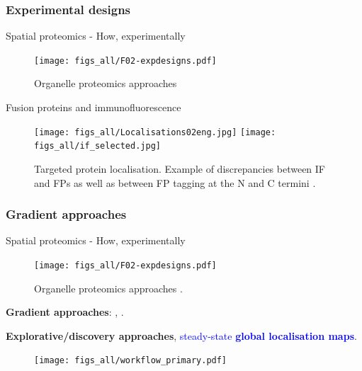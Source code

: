 \subsubsection*{Experimental designs}
\label{sec:expdesign}

\begin{frame}{Spatial proteomics - How, experimentally}
  \begin{figure}
    \texttt{[image: figs\_all/F02-expdesigns.pdf]}
    \caption{Organelle proteomics approaches \citep{Gatto:2010}}
  \end{figure}
\end{frame}

\begin{frame}{Fusion proteins and immunofluorescence}

  \begin{figure}[h]
    \centering
    \texttt{[image: figs\_all/Localisations02eng.jpg]}
    \texttt{[image: figs\_all/if\_selected.jpg]}
    \caption{Targeted protein localisation. Example of discrepancies
      between IF and FPs as well as between FP tagging at the N and C
      termini \citep{Stadler:2013}.}
  \end{figure}
\end{frame}


\subsubsection*{Gradient approaches}
\label{sec:grad}

\begin{frame}{Spatial proteomics - How, experimentally}
  \begin{figure}
    \texttt{[image: figs\_all/F02-expdesigns.pdf]}
    \caption{Organelle proteomics approaches
      \citep{Gatto:2010}.}
  \end{figure}

  \textbf{Gradient approaches}: \cite{Dunkley:2006},
  \cite{Foster2006}.

  \bigskip

  \textbf{Explorative/discovery approaches},
  \textcolor{Blue}{steady-state \textbf{global localisation maps}}.
\end{frame}


\begin{frame}{}
  \begin{figure}
    \texttt{[image: figs\_all/workflow\_primary.pdf]}
  \end{figure}
\end{frame}

